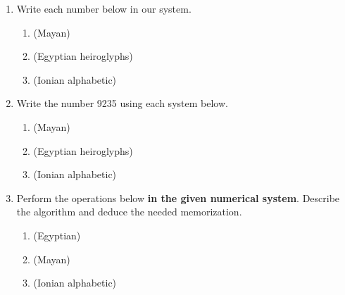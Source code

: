 \documentclass[12pt]{article}
\renewcommand{\emph}[1]{\textsf{\textbf{#1}}}
\begin{document}
\newpage
\begin{enumerate}
\item Write each number below in our system.
	\begin{enumerate}
	\item (Mayan)
	\vfill
	\item (Egyptian heiroglyphs)
	\vfill
	\item (Ionian alphabetic)
	\vfill
	\end{enumerate}
\item Write the number 9235 using each system below.
	\begin{enumerate}
	\item (Mayan)
	\vfill
	\item (Egyptian heiroglyphs)
	\vfill
	\item (Ionian alphabetic)
	\vfill
	\end{enumerate}
\newpage
\item Perform the operations below \emph{in the given numerical system}. Describe the algorithm and deduce the needed memorization.
	\begin{enumerate}
	\item (Egyptian)
	\vfill
	\item (Mayan)
	\vfill
	\item (Ionian alphabetic)
	\vfill
	\end{enumerate}
	
	

\end{enumerate}
\end{document}
